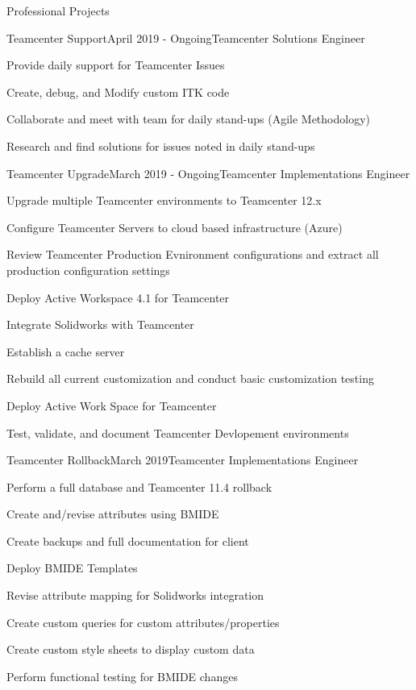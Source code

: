 \documentclass{resume} %
\begin{document}
\begin{rSection}{Professional Projects}
    
    \begin{rSubsection}{Teamcenter Support}{April 2019 - Ongoing}{Teamcenter Solutions Engineer}{}
        \item Provide daily support for Teamcenter Issues
        \item Create, debug, and Modify custom ITK code
        \item Collaborate and meet with team for daily stand-ups (Agile Methodology)
        \item Research and find solutions for issues noted in daily stand-ups
    \end{rSubsection}
    
    \begin{rSubsection}{Teamcenter Upgrade}{March 2019 - Ongoing}{Teamcenter Implementations Engineer}{}
        \item Upgrade multiple Teamcenter environments to Teamcenter 12.x
        \item Configure Teamcenter Servers to cloud based infrastructure (Azure)
        \item Review Teamcenter Production Evnironment configurations and extract all production configuration settings
        \item Deploy Active Workspace 4.1 for Teamcenter
        \item Integrate Solidworks with Teamcenter
        \item Establish a cache server 
        \item Rebuild all current customization and conduct basic customization testing 
        \item Deploy Active Work Space for Teamcenter
        \item Test, validate, and document Teamcenter Devlopement environments 
    \end{rSubsection}
    
    \pagebreak 
    
    \begin{rSubsection}{Teamcenter Rollback}{March 2019}{Teamcenter Implementations Engineer}{}
        \item Perform a full database and Teamcenter 11.4 rollback
        \item Create and/revise attributes using BMIDE
        \item Create backups and full documentation for client
        \item Deploy BMIDE Templates
        \item Revise attribute mapping for Solidworks integration 
        \item Create custom queries for custom attributes/properties
        \item Create custom style sheets to display custom data
        \item Perform functional testing for BMIDE changes
    \end{rSubsection}
        

\end{rSection}
\end{document}
